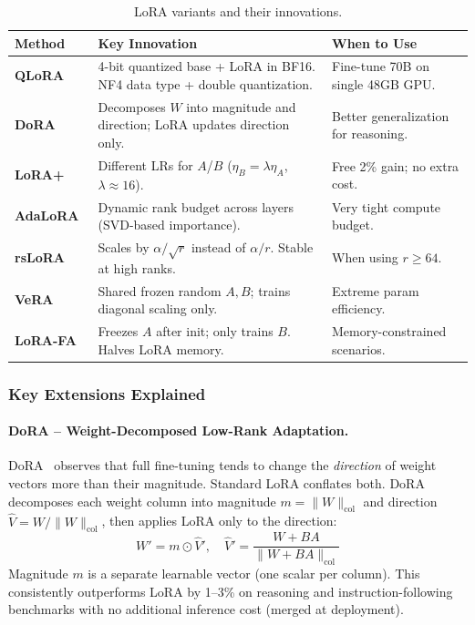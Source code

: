 \begin{table}[ht!]
\centering
\caption{LoRA variants and their innovations.}
\begin{tabular}{@{}lp{5cm}p{6.5cm}@{}}
\toprule
\textbf{Method} & \textbf{Key Innovation} & \textbf{When to Use} \\
\midrule
\textbf{QLoRA}~\cite{dettmers2023qlora} & 4-bit quantized base + LoRA in BF16. NF4 data type + double quantization. & Fine-tune 70B on single 48GB GPU. \\
\textbf{DoRA}~\cite{liu2024dora} & Decomposes $W$ into magnitude and direction; LoRA updates direction only. & Better generalization for reasoning. \\
\textbf{LoRA+}~\cite{hayou2024loraplus} & Different LRs for $A$/$B$ ($\eta_B = \lambda \eta_A$, $\lambda \approx 16$). & Free 2\% gain; no extra cost. \\
\textbf{AdaLoRA}~\cite{zhang2023adalora} & Dynamic rank budget across layers (SVD-based importance). & Very tight compute budget. \\
\textbf{rsLoRA}~\cite{kalajdzievski2023rslora} & Scales by $\alpha/\sqrt{r}$ instead of $\alpha/r$. Stable at high ranks. & When using $r \geq 64$. \\
\textbf{VeRA}~\cite{kopiczko2024vera} & Shared frozen random $A, B$; trains diagonal scaling only. & Extreme param efficiency. \\
\textbf{LoRA-FA} & Freezes $A$ after init; only trains $B$. Halves LoRA memory. & Memory-constrained scenarios. \\
\bottomrule
\end{tabular}
\end{table}

\subsubsection{Key Extensions Explained}
\label{key-extensions-explained}

\paragraph{DoRA -- Weight-Decomposed Low-Rank Adaptation.}
\label{dora-weight-decomposed-low-rank-adaptation.}

DoRA~\cite{liu2024dora} observes that full fine-tuning tends to change the \emph{direction} of weight vectors more than their magnitude. Standard LoRA conflates both. DoRA decomposes each weight column into magnitude $m = \|W\|_\text{col}$ and direction $\hat{V} = W / \|W\|_\text{col}$, then applies LoRA only to the direction: 
\[
W' = m \odot \hat{V}', \quad \hat{V}' = \frac{W + BA}{\|W + BA\|_\text{col}}
\]
 Magnitude $m$ is a separate learnable vector (one scalar per column). This consistently outperforms LoRA by 1--3\% on reasoning and instruction-following benchmarks with no additional inference cost (merged at deployment).


